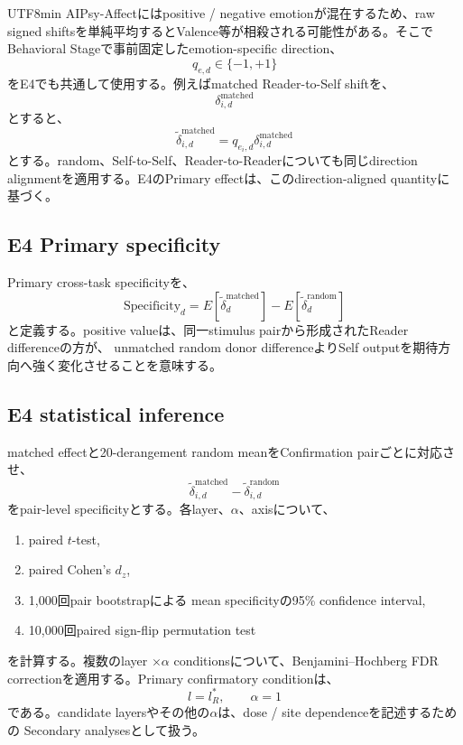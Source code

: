 \documentclass{article} %
\begin{document}
\begin{CJK*}{UTF8}{min}
AIPsy-Affectにはpositive / negative emotionが混在するため、raw signed shiftsを単純平均するとValence等が相殺される可能性がある。そこでBehavioral Stageで事前固定したemotion-specific direction、
\[
q_{e,d}
\in
\{-1,+1\}
\]
をE4でも共通して使用する。例えばmatched Reader-to-Self shiftを、
\[
\delta^{\mathrm{matched}}_{i,d}
\]
とすると、
\[
\widetilde{\delta}^{\mathrm{matched}}_{i,d}
=
q_{e_i,d}
\delta^{\mathrm{matched}}_{i,d}
\]
とする。random、Self-to-Self、Reader-to-Readerについても同じdirection alignmentを適用する。E4のPrimary effectは、このdirection-aligned quantityに基づく。


\subsection{E4 Primary specificity}

Primary cross-task specificityを、
\[
\mathrm{Specificity}_d
=
E[
\widetilde{\delta}^{\mathrm{matched}}_d
]
-
E[
\widetilde{\delta}^{\mathrm{random}}_d
]
\]
と定義する。positive valueは、同一stimulus pairから形成されたReader differenceの方が、
unmatched random donor differenceよりSelf outputを期待方向へ強く変化させることを意味する。


\subsection{E4 statistical inference}

matched effectと20-derangement random meanをConfirmation pairごとに対応させ、
\[
\widetilde{\delta}^{\mathrm{matched}}_{i,d}
-
\widetilde{\delta}^{\mathrm{random}}_{i,d}
\]
をpair-level specificityとする。各layer、\(\alpha\)、axisについて、
\begin{enumerate}
    \item paired \(t\)-test,
    \item paired Cohen's \(d_z\),
    \item 1,000回pair bootstrapによる
    mean specificityの95\% confidence interval,
    \item 10,000回paired sign-flip permutation test
\end{enumerate}
を計算する。複数のlayer \(\times\alpha\) conditionsについて、Benjamini--Hochberg FDR correctionを適用する。Primary confirmatory conditionは、
\[
l=l_R^{*},
\qquad
\alpha=1
\]
である。candidate layersやその他の\(\alpha\)は、dose / site dependenceを記述するための
Secondary analysesとして扱う。



\end{CJK*}
\end{document}
